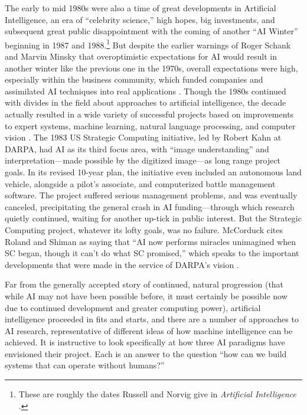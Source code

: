 The early to mid 1980s were also a time of great developments in
Artificial Intelligence, an era of ``celebrity science,'' high hopes,
big investments, and subsequent great public disappointment with the
coming of another ``AI Winter'' beginning in 1987 and
1988.\footnote{These are roughly the dates Russell and Norvig give in
  \emph{Artificial Intelligence} \cite{russellnorvig}.} But despite the
earlier warnings of Roger Schank and Marvin Minsky that overoptimistic
expectations for AI would result in another winter like the previous
one in the 1970s, overall expectations were high, especially within
the business community, which funded companies and assimilated AI
techniques into real applications \cite[Afterword]{mccorduck}. Though
the 1980s continued with divides in 
the field about approaches to artificial intelligence, the decade
actually resulted in a wide variety of successful projects based on
improvements to expert systems, machine learning, natural language
processing, and computer vision \cite[Afterword]{mccorduck}. The 1983 US Strategic Computing
initiative, led by Robert Kahn at DARPA, had AI as its third focus
area, with ``image understanding'' and interpretation---made possible by
the digitized image---as long range project goals. In its revised
10-year plan, the initiative even included an autonomous land vehicle,
alongside a pilot's associate, and computerized battle management
software. The project suffered serious management problems, and
was eventually canceled, precipitating the general crash in AI
funding---through which research quietly continued, waiting for another
up-tick in public interest. But the Strategic Computing project,
whatever its lofty goals, was no failure. McCorduck cites Roland and
Shiman as saying that ``AI now performs miracles unimagined when SC
began, though it can't do what SC promised,'' which speaks to the
important developments that were made in the service of DARPA's vision
\cite[Afterword]{mccorduck}.


Far from the generally accepted story of continued, natural
progression (that while AI may not have been possible before, it must
certainly be possible now due to continued development and greater
computing power), artificial intelligence proceeded in fits and
starts, and there are a number of approaches to AI research,
representative of different
ideas of how machine intelligence can be achieved. It is instructive
to look specifically at how three AI paradigms have envisioned their project.
Each is an answer to the question ``how can we build systems that
can operate without humans?''

